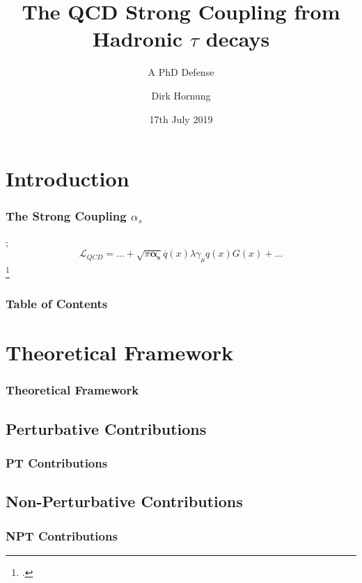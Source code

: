 \documentclass{beamer}
\title[\(The Strong Coupling\)]{The QCD Strong Coupling from Hadronic \(\tau\) decays}
\subtitle{A PhD Defense}
\author{Dirk Hornung}
\institute{
  Universitat Autònoma de Barcelona \\
  \tiny
  Departamiento de Física
}
\date{17th July 2019}
\begin{document}
\frame{\titlepage}

\section{Introduction}
\begin{frame}
  \frametitle{The Strong Coupling \(\alpha_s\)}
  
  ;
  \begin{equation}
    \mathcal{L}_{QCD} = \dots + \sqrt{\pi \bm{\alpha_s}} \overline{q}(x) \lambda \gamma_\mu q (x) G(x) + \dots  
  \end{equation}
  \footcite{Beneke2008}
\end{frame}

\begin{frame}
  \frametitle{Table of Contents}
  \tableofcontents
\end{frame} 

\section{Theoretical Framework}
\begin{frame}
  \frametitle{Theoretical Framework}
\end{frame}
\subsection{Perturbative Contributions}
\begin{frame}
  \frametitle{PT Contributions}
\end{frame}
\subsection{Non-Perturbative Contributions}
\begin{frame}
  \frametitle{NPT Contributions}
\end{frame}

\begin{frame}
  \printbibliography
\end{frame}
\end{document}
